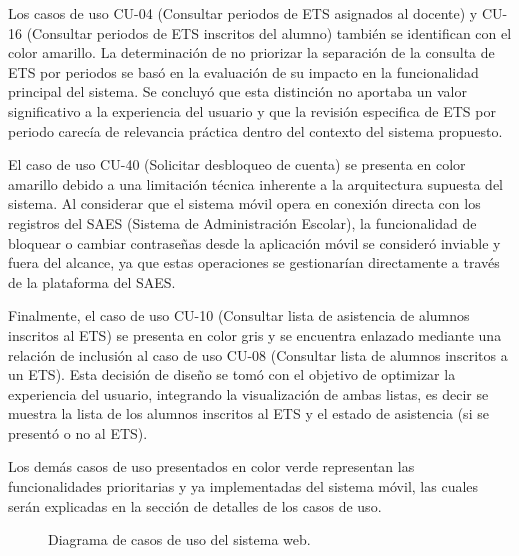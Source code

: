 Los casos de uso CU-04 (Consultar periodos de ETS asignados al docente) y CU-16 (Consultar periodos de ETS inscritos del alumno) también se identifican con el color amarillo. La determinación de no priorizar la separación de la consulta de ETS por periodos se basó en la evaluación de su impacto en la funcionalidad principal del sistema. Se concluyó que esta distinción no aportaba un valor significativo a la experiencia del usuario y que la revisión especifica de ETS por periodo carecía de relevancia práctica dentro del contexto del sistema propuesto.


El caso de uso CU-40 (Solicitar desbloqueo de cuenta) se presenta en color amarillo debido a una limitación técnica inherente a la arquitectura supuesta del sistema. Al considerar que el sistema móvil opera en conexión directa con los registros del SAES (Sistema de Administración Escolar), la funcionalidad de bloquear o cambiar contraseñas desde la aplicación móvil se consideró inviable y fuera del alcance, ya que estas operaciones se gestionarían directamente a través de la plataforma del SAES.


Finalmente, el caso de uso CU-10 (Consultar lista de asistencia de alumnos inscritos al ETS) se presenta en color gris y se encuentra enlazado mediante una relación de inclusión al caso de uso CU-08 (Consultar lista de alumnos inscritos a un ETS). Esta decisión de diseño se tomó con el objetivo de optimizar la experiencia del usuario, integrando la visualización de ambas listas, es decir se muestra la lista de los alumnos inscritos al ETS y el estado de asistencia (si se presentó o no al ETS).


Los demás casos de uso presentados en color verde representan las funcionalidades prioritarias y ya implementadas del sistema móvil, las cuales serán explicadas en la sección de detalles de los casos de uso.


\newpage

\begin{figure}[htbp!]
	\begin{center}
		\caption{Diagrama de casos de uso del sistema web.}
		\label{fig:casosDeUso2}
	\end{center}
\end{figure}


